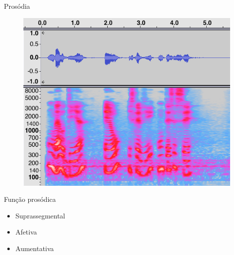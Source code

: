 \documentclass{beamer}
\begin{document}
\begin{frame}{Prosódia}
    \begin{figure}
      \includegraphics[scale=0.50]{espectro.png}
    \end{figure}
\end{frame}

\begin{frame}{Função prosódica}
  \begin{itemize}
    \item Suprassegmental
    \item Afetiva
    \item Aumentativa
  \end{itemize}
\end{frame}
\end{document}
